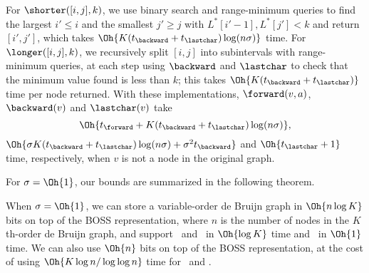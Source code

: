 For \(\shorter([i, j], k)\), we use binary search and range-minimum queries to find the largest \(i' \leq i\) and the smallest
\(j' \geq j\) with \(L^* [i' - 1], L^* [j'] < k\) and return \([i', j']\), which takes $\Oh{K (t_\backward + t_\lastchar) \log (n \sigma)}$ time. 
For \(\longer([i, j], k)\), we recursively split \([i, j]\) into subintervals with range-minimum queries, at each step using $\backward$ and $\lastchar$ to check that the minimum value found is less than $k$; this takes $\Oh{K (t_\backward + t_\lastchar)}$ time per node returned.  With these implementations, \(\forward(v, a)\), \(\backward(v)\) and \(\lastchar(v)\) take 
\[
\Oh{t_\forward + K (t_\backward + t_\lastchar) \log (n \sigma)}, 
\]
$\Oh{\sigma K (t_\backward + t_\lastchar) \log (n \sigma) + \sigma^2 t_\backward}$ and $\Oh{t_\lastchar + 1}$ time, respectively, when $v$ is not a node in the original graph.

For \(\sigma = \Oh{1}\), our bounds are summarized in the following theorem. %

\begin{theorem}
\label{thm:bounds}
When \(\sigma = \Oh{1}\), we can store a variable-order de Bruijn graph in $\Oh{n \log K}$ bits on top of the BOSS representation, where $n$
is the number of nodes in the $K$th-order de Bruijn graph, and support \forward\ and \backward\ in $\Oh{\log K}$ time and \lastchar\ in
$\Oh{1}$ time.  We can also use $\Oh{n}$ bits on top of the BOSS representation, at the cost of using $\Oh{K \log n / \log \log n}$ time
for \forward\ and \backward.
\end{theorem}




